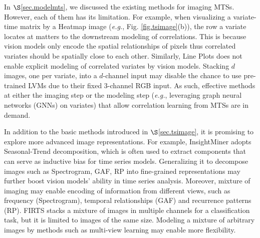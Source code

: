 \vspace{0.2cm}


 In $\S$\ref{sec.modelmts}, we discussed the existing methods for imaging MTSs. However, each of them has its limitation. For example, when visualizing a variate-time matrix by a Heatmap image ({\em e.g.}, Fig. \ref{fig.tsimage}(b)), the row a variate locates at matters to the downstream modeling of correlations. This is because vision models only encode the spatial relationships of pixels thus correlated variates should be spatially close to each other. Similarly, Line Plots does not enable explicit modeling of correlated variates by vision models. Stacking $d$ images, one per variate, into a $d$-channel input may disable the chance to use pre-trained LVMs due to their fixed 3-channel RGB input. As such, effective methods at either the imaging step or the modeling step ({\em e.g.}, leveraging graph neural networks (GNNs) on variates) that allow correlation learning from MTSs are in demand.


\vspace{0.2cm}


 In addition to the basic methods introduced in $\S$\ref{sec.tsimage}, it is promising to explore more advanced image representations. %
For example, InsightMiner \cite{zhang2023insight} adopts Seasonal-Trend decomposition, which is often used to extract components that can serve as inductive bias for time series models. Generalizing it to decompose images such as Spectrogram, GAF, RP into fine-grained representations may further boost vision models' ability in time series analysis. Moreover, mixture of imaging may enable encoding of information from different views, such as frequency (Spectrogram), temporal relationships (GAF) and recurrence patterns (RP). FIRTS \cite{costa2024fusion} stacks a mixture of images in multiple channels for a classification task, but it is limited to images of the same size. Modeling a mixture of arbitrary images by methods such as multi-view learning may enable more flexibility.

